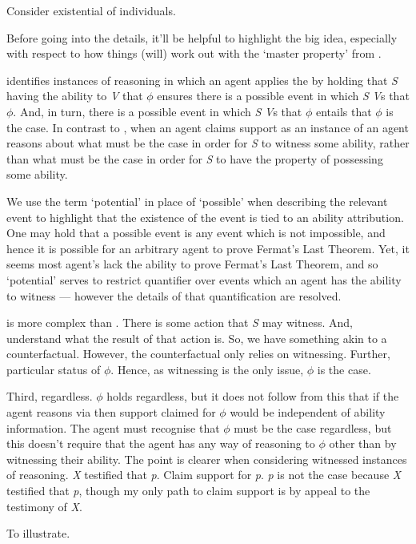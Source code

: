 \begin{note}[\WR{} def.]
{    Consider existential of individuals.
  }

  {
    \color{green}
    Before going into the details, it'll be helpful to highlight the big idea, especially with respect to how things (will) work out with the `master property' from \AR{}.
  }

  \WR{} identifies instances of reasoning in which an agent applies the \aben{} by holding that \emph{S} having the ability to \emph{V} that \(\phi\) ensures there is a possible event in which \emph{S} \emph{V}s that \(\phi\).
  And, in turn, there is a possible event in which \emph{S} \emph{V}s that \(\phi\) entails that \(\phi\) is the case.
  In contrast to \AR{}, when an agent claims support as an instance of \WR{} an agent reasons about what must be the case in order for \emph{S} to witness some ability, rather than what must be the case in order for \emph{S} to have the property of possessing some ability.


  We use the term `potential' in place of `possible' when describing the relevant event to highlight that the existence of the event is tied to an ability attribution.
  One may hold that a possible event is any event which is not impossible, and hence it is possible for an arbitrary agent to prove Fermat's Last Theorem.
  Yet, it seems most agent's lack the ability to prove Fermat's Last Theorem, and so `potential' serves to restrict quantifier over events which an agent has the ability to witness --- however the details of that quantification are resolved.

  {
    \color{red}
    \WR{} is more complex than \AR{}.
    There is some action that \emph{S} may witness.
    And, understand what the result of that action is.
    So, we have something akin to a counterfactual.
    However, the counterfactual only relies on witnessing.
    Further, particular status of \(\phi\).
    Hence, as witnessing is the only issue, \(\phi\) is the case.

    Third, regardless.
    \(\phi\) holds regardless, but it does not follow from this that if the agent reasons via \WR{} then support claimed for \(\phi\) would be independent of ability information.
    The agent must recognise that \(\phi\) must be the case regardless, but this doesn't require that the agent has any way of reasoning to \(\phi\) other than by witnessing their ability.
    The point is clearer when considering witnessed instances of reasoning.
    \emph{X} testified that \emph{p}.
    Claim support for \emph{p}.
    \emph{p} is not the case because \emph{X} testified that \emph{p}, though my only path to claim support is by appeal to the testimony of \emph{X}.
  }
  To illustrate.


\end{note}
